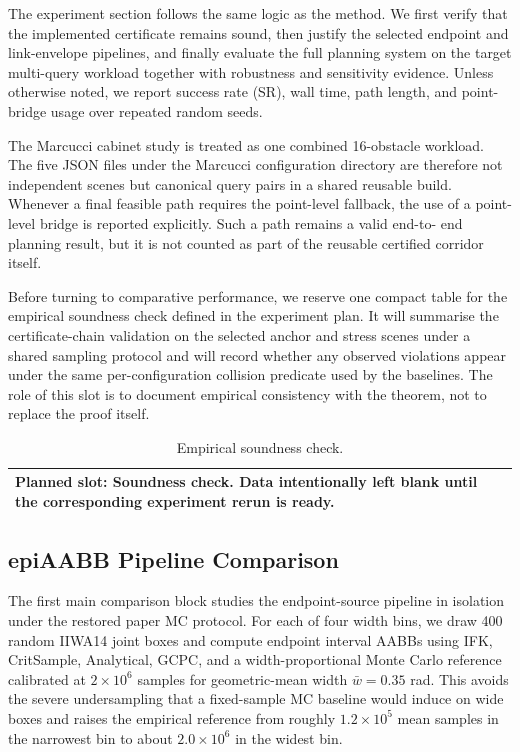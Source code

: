 \documentclass[journal]{IEEEtran}
\makeatletter
\newcommand{\plannedtable}[3]{%
\begin{table}[t]
  \centering
  \caption{#1}
  \label{#2}
  \small
  \begin{tabular}{@{}p{0.94\columnwidth}@{}}
    \toprule
    Planned slot: #3. Data intentionally left blank until the corresponding
    experiment rerun is ready. \\
    \bottomrule
  \end{tabular}
\end{table}
}
\makeatother
\begin{document}
The experiment section follows the same logic as the method. We first verify
that the implemented certificate remains sound, then justify the selected
endpoint and link-envelope pipelines, and finally evaluate the full planning
system on the target multi-query workload together with robustness and
sensitivity evidence. Unless otherwise noted, we report success rate (SR), wall
time, path length, and point-bridge usage over repeated random seeds.

The Marcucci cabinet study is treated as one combined 16-obstacle workload.
The five JSON files under the Marcucci configuration directory are therefore
not independent scenes but canonical query pairs in a shared reusable build.
Whenever a final feasible path requires the point-level fallback, the use of a
point-level bridge is reported explicitly. Such a path remains a valid end-to-
end planning result, but it is not counted as part of the reusable certified
corridor itself.


Before turning to comparative performance, we reserve one compact table for the
empirical soundness check defined in the experiment plan. It will summarise the
certificate-chain validation on the selected anchor and stress scenes under a
shared sampling protocol and will record whether any observed violations appear
under the same per-configuration collision predicate used by the baselines.
The role of this slot is to document empirical consistency with the theorem,
not to replace the proof itself.

\plannedtable{Empirical soundness check.}{tab:soundness}{Soundness check}

\subsection{epiAABB Pipeline Comparison}\label{sec:exp_epiaabb}

The first main comparison block studies the endpoint-source pipeline in
isolation under the restored paper MC protocol. For each of four width bins,
we draw 400 random IIWA14 joint boxes and compute endpoint interval AABBs using
IFK, CritSample, Analytical, GCPC, and a width-proportional Monte Carlo
reference calibrated at $2\times 10^6$ samples for geometric-mean width
$\bar{w}=0.35$ rad. This avoids the severe undersampling that a fixed-sample MC
baseline would induce on wide boxes and raises the empirical reference from
roughly $1.2\times 10^5$ mean samples in the narrowest bin to about
$2.0\times 10^6$ in the widest bin.
\end{document}
